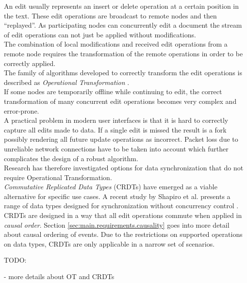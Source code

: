 An edit usually represents an insert or delete operation at a certain position in the text.
These edit operations are broadcast to remote nodes and then ``replayed''.
As participating nodes can concurrently edit a document the stream of edit operations can not just be applied without modifications.\\
The combination of local modifications and received edit operations from a remote node requires the transformation of the remote operations in order to be correctly applied.\\
The family of algorithms developed to correctly transform the edit operations is described as \emph{Operational Transformation} \cite{Ellis:1998vf}.\\
If some nodes are temporarily offline while continuing to edit, the correct transformation of many concurrent edit operations becomes very complex and error-prone.\\
A practical problem in modern user interfaces is that it is hard to correctly capture all edits made to data.
If a single edit is missed the result is a fork possibly rendering all future update operations as incorrect.
Packet loss due to unreliable network connections have to be taken into account which further complicates the design of a robust algorithm.\\
Research has therefore investigated options for data synchronization that do not require Operational Transformation.\\

\emph{Commutative Replicated Data Types} (CRDTs) have emerged as a viable alternative for specific use cases.
A recent study by Shapiro et al. presents a range of data types designed for synchronization without concurrency control \cite{Shapiro:2011wy}.\\
CRDTs are designed in a way that all edit operations commute when applied in \emph{causal order}.
Section \ref{sec:main.requirements.causality} goes into more detail about causal ordering of events.
Due to the restrictions on supported operations on data types, CRDTs are only applicable in a narrow set of scenarios.

TODO:

- more details about OT and CRDTs

